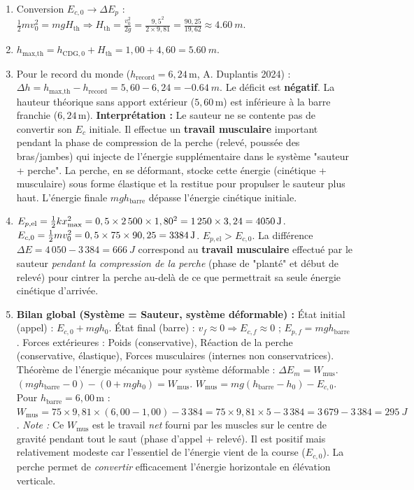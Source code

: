 \documentclass[11pt]{article}
\begin{document}
\begin{corrige}
\begin{enumerate}
    \item Conversion $E_{c,0} \to \Delta E_p$ : $\frac{1}{2}mv_0^2 = mgH_{\text{th}} \Rightarrow H_{\text{th}} = \frac{v_0^2}{2g} = \frac{9,5^2}{2 \times 9,81} = \frac{90,25}{19,62} \approx \SI{4,60}{m}$.
    \item $h_{\text{max,th}} = h_{\text{CDG},0} + H_{\text{th}} = 1,00 + 4,60 = \SI{5,60}{m}$.
    \item Pour le record du monde ($h_{\text{record}} = 6,24\,\text{m}$, A. Duplantis 2024) :
    $\Delta h = h_{\text{max,th}} - h_{\text{record}} = 5,60 - 6,24 = \SI{-0,64}{m}$.
    Le déficit est \textbf{négatif}. La hauteur théorique sans apport extérieur ($5,60\,\text{m}$) est inférieure à la barre franchie ($6,24\,\text{m}$).
    \textbf{Interprétation :} Le sauteur ne se contente pas de convertir son $E_c$ initiale. Il effectue un \textbf{travail musculaire} important pendant la phase de compression de la perche (relevé, poussée des bras/jambes) qui injecte de l'énergie supplémentaire dans le système "sauteur + perche". La perche, en se déformant, stocke cette énergie (cinétique + musculaire) sous forme élastique et la restitue pour propulser le sauteur plus haut. L'énergie finale $mg h_{\text{barre}}$ dépasse l'énergie cinétique initiale.
    \item $E_{p,\text{el}} = \frac{1}{2}k x_{\text{max}}^2 = 0,5 \times 2\,500 \times 1,80^2 = 1\,250 \times 3,24 = \SI{4\,050}{J}$.
    $E_{c,0} = \frac{1}{2}mv_0^2 = 0,5 \times 75 \times 90,25 = \SI{3\,384}{J}$.
    $E_{p,\text{el}} > E_{c,0}$. La différence $\Delta E = 4\,050 - 3\,384 = \SI{666}{J}$ correspond au \textbf{travail musculaire} effectué par le sauteur \emph{pendant la compression de la perche} (phase de "planté" et début de relevé) pour cintrer la perche au-delà de ce que permettrait sa seule énergie cinétique d'arrivée.
    \item \textbf{Bilan global (Système = Sauteur, système déformable) :}
    État initial (appel) : $E_{c,0} + mg h_0$.
    État final (barre) : $v_f \approx 0 \Rightarrow E_{c,f} \approx 0$ ; $E_{p,f} = mg h_{\text{barre}}$.
    Forces extérieures : Poids (conservative), Réaction de la perche (conservative, élastique), Forces musculaires (internes non conservatrices).
    Théorème de l'énergie mécanique pour système déformable : $\Delta E_m = W_{\text{mus}}$.
    $(mg h_{\text{barre}} - 0) - (0 + mg h_0) = W_{\text{mus}}$.
    $W_{\text{mus}} = mg(h_{\text{barre}} - h_0) - E_{c,0}$.
    Pour $h_{\text{barre}} = 6,00\,\text{m}$ :
    $W_{\text{mus}} = 75 \times 9,81 \times (6,00 - 1,00) - 3\,384 = 75 \times 9,81 \times 5 - 3\,384 = 3\,679 - 3\,384 = \SI{295}{J}$.
    \emph{Note :} Ce $W_{\text{mus}}$ est le travail \emph{net} fourni par les muscles sur le centre de gravité pendant tout le saut (phase d'appel + relevé). Il est positif mais relativement modeste car l'essentiel de l'énergie vient de la course ($E_{c,0}$). La perche permet de \emph{convertir} efficacement l'énergie horizontale en élévation verticale.
\end{enumerate}
\end{corrige}
\end{document}
